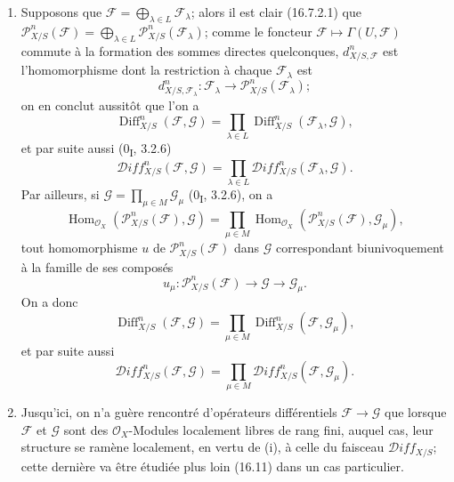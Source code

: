 \begin{remarks}[16.8.11]
\label{IV.16.8.11}
\begin{enumerate}
  \item[(i)] Supposons que
  $\mathscr{F}=\bigoplus_{\lambda\in L}\mathscr{F}_\lambda$; alors il est
  clair (16.7.2.1) que
  $\mathscr{P}_{X/S}^n(\mathscr{F})=
  \bigoplus_{\lambda\in L}\mathscr{P}_{X/S}^n(\mathscr{F}_\lambda)$; comme le
  foncteur $\mathscr{F}\mapsto\Gamma(U,\mathscr{F})$ commute à la formation
  des sommes directes quelconques, $d_{X/S,\mathscr{F}}^n$ est
  l'homomorphisme dont la restriction à chaque $\mathscr{F}_\lambda$ est
  \[
    d_{X/S,\mathscr{F}_\lambda}^n:\mathscr{F}_\lambda
    \longrightarrow\mathscr{P}_{X/S}^n(\mathscr{F}_\lambda);
  \]
  on en conclut aussitôt que l'on a
  \[
    \operatorname{Diff}_{X/S}^n(\mathscr{F},\mathscr{G})
    =\prod_{\lambda\in L}
    \operatorname{Diff}_{X/S}^n(\mathscr{F}_\lambda,\mathscr{G}),
  \]
  et par suite aussi (0\textsubscript{I}, 3.2.6)
  \[
    \mathscr{D}\!iff_{X/S}^n(\mathscr{F},\mathscr{G})
    =\prod_{\lambda\in L}
    \mathscr{D}\!iff_{X/S}^n(\mathscr{F}_\lambda,\mathscr{G}).
  \]
  Par ailleurs, si $\mathscr{G}=\prod_{\mu\in M}\mathscr{G}_\mu$
  (0\textsubscript{I}, 3.2.6), on a
  \[
    \operatorname{Hom}_{\mathcal{O}_X}
    (\mathscr{P}_{X/S}^n(\mathscr{F}),\mathscr{G})
    =\prod_{\mu\in M}\operatorname{Hom}_{\mathcal{O}_X}
    (\mathscr{P}_{X/S}^n(\mathscr{F}),\mathscr{G}_\mu),
  \]
  tout homomorphisme $u$ de $\mathscr{P}_{X/S}^n(\mathscr{F})$ dans
  $\mathscr{G}$ correspondant biunivoquement à la famille de ses composés
  \[
    u_\mu:\mathscr{P}_{X/S}^n(\mathscr{F})
    \longrightarrow\mathscr{G}\longrightarrow\mathscr{G}_\mu.
  \]
  On a donc
  \[
    \operatorname{Diff}_{X/S}^n(\mathscr{F},\mathscr{G})
    =\prod_{\mu\in M}
    \operatorname{Diff}_{X/S}^n(\mathscr{F},\mathscr{G}_\mu),
  \]
  et par suite aussi
  \[
    \mathscr{D}\!iff_{X/S}^n(\mathscr{F},\mathscr{G})
    =\prod_{\mu\in M}
    \mathscr{D}\!iff_{X/S}^n(\mathscr{F},\mathscr{G}_\mu).
  \]
  \item[(ii)] Jusqu'ici, on n'a guère rencontré d'opérateurs différentiels
  $\mathscr{F}\to\mathscr{G}$ que lorsque $\mathscr{F}$ et $\mathscr{G}$ sont
  des $\mathcal{O}_X$-Modules localement libres de rang fini, auquel cas, leur
  structure se ramène localement, en vertu de (i), à celle du faisceau
  $\mathscr{D}\!iff_{X/S}$; cette dernière va être étudiée plus loin (16.11)
  dans un cas particulier.
\end{enumerate}
\end{remarks}

